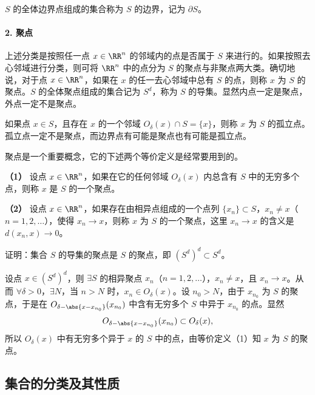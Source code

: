 $S$ 的全体边界点组成的集合称为 $S$ 的边界，记为 $\partial S$。

\paragraph{2. 聚点}
上述分类是按照任一点 $x\in\RR^n$ 的邻域内的点是否属于 $S$ 来进行的。如果按照去心邻域进行分类，则可将 $\RR^n$ 中的点分为 $S$ 的聚点与非聚点两大类。确切地说，对于点 $x\in\RR^n$，如果在 $x$ 的任一去心邻域中总有 $S$ 的点，则称 $x$ 为 $S$ 的聚点。$S$ 的全体聚点组成的集合记为 $S^d$，称为 $S$ 的导集。显然内点一定是聚点，外点一定不是聚点。

如果点 $x\in S$，且存在 $x$ 的一个邻域 $O_\delta(x)\cap S=\{x\}$，则称 $x$ 为 $S$ 的孤立点。孤立点一定不是聚点，而边界点有可能是聚点也有可能是孤立点。

聚点是一个重要概念，它的下述两个等价定义是经常要用到的。

\begin{xdefinition}
\textbf{（1）} 设点 $x\in\RR^n$，如果在它的任何邻域 $O_\delta(x)$ 内总含有 $S$ 中的无穷多个点，则称 $x$ 是 $S$ 的一个聚点。
\end{xdefinition}

\begin{xdefinition}
\textbf{（2）} 设点 $x\in\RR^n$，如果存在由相异点组成的一个点列 $\{x_n\}\subset S$，$x_n\neq x$（$n=1,2,\ldots$），使得 $x_n\to x$，则称 $x$ 为 $S$ 的一个聚点，这里 $x_n\to x$ 的含义是 $d(x_n,x)\to0$。
\end{xdefinition}

\begin{xexample}[17.1.1]
证明：集合 $S$ 的导集的聚点是 $S$ 的聚点，即 $(S^d)^d\subset S^d$。
\end{xexample}
\begin{xproof}
设点 $x\in(S^d)^d$，则 $\exists S$ 的相异聚点 $x_n$（$n=1,2,\ldots$），$x_n\neq x$，且 $x_n\to x$。从而 $\forall\delta>0$，$\exists N$，当 $n>N$ 时，$x_n\in O_\delta(x)$。设 $n_0>N$，由于 $x_{n_0}$ 为 $S$ 的聚点，于是在 $O_{\delta-\abs{x-x_{n_0}}}(x_{n_0})$ 中含有无穷多个 $S$ 中异于 $x_{n_0}$ 的点。显然
\[
  O_{\delta-\abs{x-x_{n_0}}}(x_{n_0})\subset O_\delta(x),
\]
所以 $O_\delta(x)$ 中有无穷多个异于 $x$ 的 $S$ 中的点，由等价定义（1）知 $x$ 为 $S$ 的聚点。
\end{xproof}

\subsection{集合的分类及其性质}

